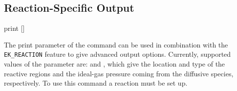 \subsection{\label{ssec:ek-reac-output}Reaction-Specific Output}

\begin{essyntax}
  print 
   []
  \begin{features}
  \end{features}
\end{essyntax}
The print parameter of the  command can be used in
combination with the \texttt{EK\_REACTION} feature to give advanced output 
options. Currently, supported values of the parameter  are: 
 and , which give the 
location and type of the reactive regions and the ideal-gas pressure coming from 
the diffusive species, respectively. To use this command a reaction must be set up.

